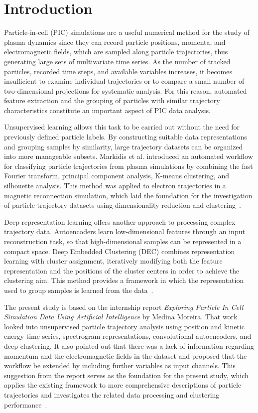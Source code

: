 \section{Introduction}\label{sec:introduction}

Particle-in-cell (PIC) simulations are a useful numerical method for the study of plasma dynamics since they can record particle positions, momenta, and electromagnetic fields, which are sampled along particle trajectories, thus generating large sets of multivariate time series. As the number of tracked particles, recorded time steps, and available variables increases, it becomes insufficient to examine individual trajectories or to compare a small number of two-dimensional projections for systematic analysis. For this reason, automated feature extraction and the grouping of particles with similar trajectory characteristics constitute an important aspect of PIC data analysis.

Unsupervised learning allows this task to be carried out without the need for previously defined particle labels. By constructing suitable data representations and grouping samples by similarity, large trajectory datasets can be organized into more manageable subsets. Markidis et al. introduced an automated workflow for classifying particle trajectories from plasma simulations by combining the fast Fourier transform, principal component analysis, K-means clustering, and silhouette analysis. This method was applied to electron trajectories in a magnetic reconnection simulation, which laid the foundation for the investigation of particle trajectory datasets using dimensionality reduction and clustering~\cite{markidis2020}.

Deep representation learning offers another approach to processing complex trajectory data. Autoencoders learn low-dimensional features through an input reconstruction task, so that high-dimensional samples can be represented in a compact space. Deep Embedded Clustering (DEC) combines representation learning with cluster assignment, iteratively modifying both the feature representation and the positions of the cluster centers in order to achieve the clustering aim. This method provides a framework in which the representation used to group samples is learned from the data~\cite{xie2016}.

The present study is based on the internship report \textit{Exploring Particle In Cell Simulation Data Using Artificial Intelligence} by Medina Moreira. That work looked into unsupervised particle trajectory analysis using position and kinetic energy time series, spectrogram representations, convolutional autoencoders, and deep clustering. It also pointed out that there was a lack of information regarding momentum and the electromagnetic fields in the dataset and proposed that the workflow be extended by including further variables as input channels. This suggestion from the report serves as the foundation for the present study, which applies the existing framework to more comprehensive descriptions of particle trajectories and investigates the related data processing and clustering performance~\cite{moreiraReport}.


